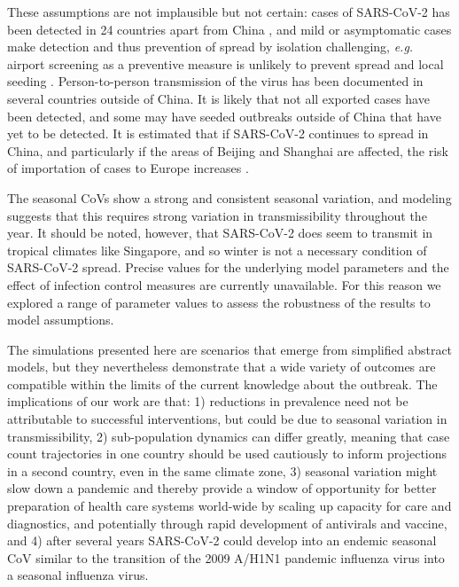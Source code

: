 \documentclass[rmp, reprint, superscriptaddress, floatfix,amsmath]{revtex4-1}
\begin{document}
These assumptions are not implausible but not certain: cases of SARS-CoV-2 has been detected in 24 countries apart from China \citep{WHO_situation_report23}, and mild or asymptomatic cases make detection and thus prevention of spread by isolation challenging, \textit{e.g.} airport screening as a preventive measure is unlikely to prevent spread and local seeding \citep{quilty2020effectiveness}. 
Person-to-person transmission of the virus has been documented in several countries outside of China. 
It is likely that not all exported cases have been detected, and some may have seeded outbreaks outside of China that have yet to be detected. It is estimated that if SARS-CoV-2 continues to spread in China, and particularly if the areas of Beijing and Shanghai are affected, the risk of importation of cases to Europe increases \citep{pullano2020novel}.

The seasonal CoVs show a strong and consistent seasonal variation, and modeling suggests that this requires strong variation in transmissibility throughout the year.
It should be noted, however, that SARS-CoV-2 does seem to transmit in tropical climates like Singapore, and so winter is not a necessary condition of SARS-CoV-2 spread. 
Precise values for the underlying model parameters and the effect of infection control measures are currently unavailable. For this reason we explored a range of parameter values to assess the robustness of the results to model assumptions.


The simulations presented here are scenarios that emerge from simplified abstract models, but they nevertheless demonstrate that a wide variety of outcomes are compatible within the limits of the current knowledge about the outbreak. 
The implications of our work are that: 1) reductions in prevalence need not be attributable to successful interventions, but could be due to seasonal variation in transmissibility, 2) sub-population dynamics can differ greatly, meaning that case count trajectories in one country should be used cautiously to inform projections in a second country, even in the same climate zone, 3) seasonal variation might slow down a pandemic and thereby provide a window of opportunity for better preparation of health care systems world-wide by scaling up capacity for care and diagnostics, and potentially through rapid development of antivirals and vaccine, and 4) after several years SARS-CoV-2 could develop into an endemic seasonal CoV similar to the transition of the 2009 A/H1N1 pandemic influenza virus into a seasonal influenza virus.
\end{document}
